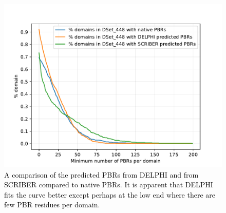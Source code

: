 \documentclass{bioinfo}
\newcommand{\mySecondColor}{black}
\begin{document}
% 
% 
% 
% 
% 
% 
% 
%



\begin{figure}
\centering
\includegraphics[width=\columnwidth]{plot_DS448_domain.pdf}
  \caption{\textcolor{\mySecondColor}{A comparison of the predicted PBRs from DELPHI and from SCRIBER compared to native PBRs.  It is apparent that DELPHI fits the curve better except perhaps at the low end where there are few PBR residues per domain.} 
  \label{fig_plot_DS448_domain}}
\end{figure}
\end{document}
